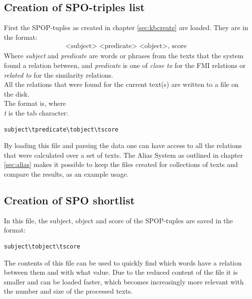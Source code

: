 \subsection{Creation of SPO-triples list}
\label{sec:makerelationlist}
First the SPOP-tuples as created in chapter \ref{sec:kbcreate} are loaded. They are in the format:
\begin{align*}
    \text{<subject> <predicate> <object>, score}
\end{align*}
Where \textit{subject} and \textit{predicate} are words or phrases from the texts that the system found a relation between, and \textit{predicate} is one of \textit{close to} for the FMI relations or \textit{related to} for the similarity relations.\\
All the relations that were found for the current text(s) are written to a file on the disk.\\
The format is, where \textit{\\t} is the tab character:
\begin{lstlisting}
subject\tpredicate\tobject\tscore
\end{lstlisting}
By loading this file and parsing the data one can have access to all the relations that were calculated over a set of texts. The Alias System as outlined in chapter \ref{sec:alias} makes it possible to keep the files created for collections of texts and compare the results, as an example usage.

\subsection{Creation of SPO shortlist}
\label{makerelationweights}
In this file,  the subject, object and score of the SPOP-tuples are saved in the format:
\begin{lstlisting}
subject\tobject\tscore
\end{lstlisting}
The contents of this file can be used to quickly find which words have a relation between them and with what value. Due to the reduced content of the file it is smaller and can be loaded faster, which becomes increasingly more relevant with the number and size of the processed texts.



